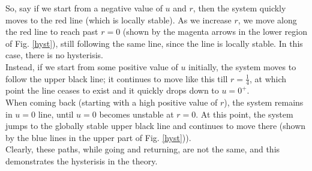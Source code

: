 \noindent
So, say if we start from a negative value of $u$ and $r$, then the system quickly moves to the red line (which is locally stable). As we increase $r$, we move along the red line to reach past $r=0$ (shown by the magenta arrows in the lower region of Fig. \ref{hyst}), still following the same line, since the line is locally stable. In this case, there is no hysterisis. \\[0.2cm]
Instead, if we start from some positive value of $u$ initially, the system moves to follow the upper black line; it continues to move like this till $r=\frac{1}{4}$, at which point the line ceases to exist and it quickly drops down to $u=0^+$. \\[0.2cm]
When coming back (starting with a high positive value of $r$), the system remains in $u=0$ line, until $u=0$ becomes unstable at $r=0$. At this point, the system jumps to the globally stable upper black line and continues to move there (shown by the blue lines in the upper part of Fig. \ref{hyst})). \\[0.2cm]
Clearly, these paths, while going and returning, are not the same, and this demonstrates the hysterisis in the theory. 
